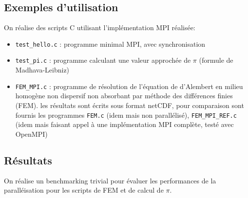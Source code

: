 \documentclass[a4paper]{article}
\begin{document}
\subsection{Exemples d'utilisation}

On réalise des scripts C utilisant l'implémentation MPI réalisée:
\begin{itemize}
    \item \verb|test_hello.c| : programme minimal MPI, avec synchronisation
    \item \verb|test_pi.c| : programme calculant une valeur approchée de $\pi$ (formule de Madhava-Leibniz)
    \item \verb|FEM_MPI.c| :  programme de résolution de l'équation de d'Alembert en milieu homogène non dispersif non absorbant par méthode des différences finies (FEM). les résultats sont écrits sous format netCDF, pour comparaison sont fournis les programmes \verb|FEM.c| (idem mais non parallélisé), \verb|FEM_MPI_REF.c| (idem mais faisant appel à une implémentation MPI complète, testé avec OpenMPI)
\end{itemize}

\subsection{Résultats}

On réalise un benchmarking trivial pour évaluer les performances de la paralléisation pour les scripts de FEM et de calcul de $\pi$.
\end{document}
